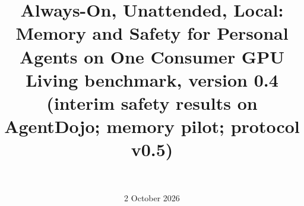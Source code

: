 \documentclass[11pt]{article}
\title{Always-On, Unattended, Local:\\Memory and Safety for Personal Agents on One Consumer GPU\\[0.4em]
\large Living benchmark, version 0.4 (interim safety results on AgentDojo; memory pilot; protocol v0.5)}
\author{\paperauthor\ifx\paperaffiliation\empty\else\\\small\paperaffiliation\fi}
\date{2 October 2026}
\begin{document}
\maketitle

\begin{abstract}

\end{abstract}
















\appendix

\end{document}
